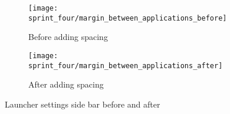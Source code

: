 \begin{figure}[!htbp]
    \centering

    \begin{subfigure}[t]{0.75\textwidth}
        \texttt{[image: sprint\_four/margin\_between\_applications\_before]}
        \caption{Before adding spacing}
        \label{fig:margin_between_applications_before}
        \vspace*{1cm}
    \end{subfigure}
    \begin{subfigure}[t]{0.75\textwidth}
        \texttt{[image: sprint\_four/margin\_between\_applications\_after]}
        \caption{After adding spacing}
        \label{fig:margin_between_applications_after}
    \end{subfigure}
    
    \caption{Launcher settings side bar before and after}
    \label{fig:margin_between_applications}
\end{figure}